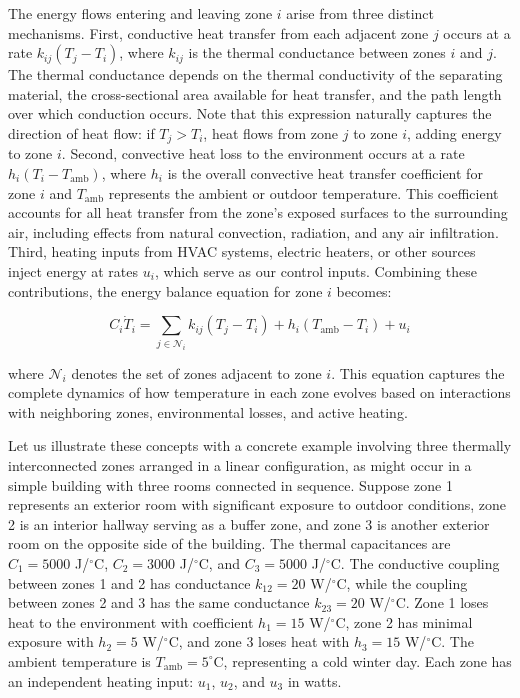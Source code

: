The energy flows entering and leaving zone $i$ arise from three distinct mechanisms. First, conductive heat transfer from each adjacent zone $j$ occurs at a rate $k_{ij}(T_j - T_i)$, where $k_{ij}$ is the thermal conductance between zones $i$ and $j$. The thermal conductance depends on the thermal conductivity of the separating material, the cross-sectional area available for heat transfer, and the path length over which conduction occurs. Note that this expression naturally captures the direction of heat flow: if $T_j > T_i$, heat flows from zone $j$ to zone $i$, adding energy to zone $i$. Second, convective heat loss to the environment occurs at a rate $h_{i}(T_i - T_{\text{amb}})$, where $h_i$ is the overall convective heat transfer coefficient for zone $i$ and $T_{\text{amb}}$ represents the ambient or outdoor temperature. This coefficient accounts for all heat transfer from the zone's exposed surfaces to the surrounding air, including effects from natural convection, radiation, and any air infiltration. Third, heating inputs from HVAC systems, electric heaters, or other sources inject energy at rates $u_i$, which serve as our control inputs. Combining these contributions, the energy balance equation for zone $i$ becomes:

$$C_i \dot{T}_i = \sum_{j \in \mathcal{N}_i} k_{ij}(T_j - T_i) + h_i(T_{\text{amb}} - T_i) + u_i$$

where $\mathcal{N}_i$ denotes the set of zones adjacent to zone $i$. This equation captures the complete dynamics of how temperature in each zone evolves based on interactions with neighboring zones, environmental losses, and active heating.

Let us illustrate these concepts with a concrete example involving three thermally interconnected zones arranged in a linear configuration, as might occur in a simple building with three rooms connected in sequence. Suppose zone 1 represents an exterior room with significant exposure to outdoor conditions, zone 2 is an interior hallway serving as a buffer zone, and zone 3 is another exterior room on the opposite side of the building. The thermal capacitances are $C_1 = 5000$ J/$\!^\circ$C, $C_2 = 3000$ J/$\!^\circ$C, and $C_3 = 5000$ J/$\!^\circ$C. The conductive coupling between zones 1 and 2 has conductance $k_{12} = 20$ W/$\!^\circ$C, while the coupling between zones 2 and 3 has the same conductance $k_{23} = 20$ W/$\!^\circ$C. Zone 1 loses heat to the environment with coefficient $h_1 = 15$ W/$\!^\circ$C, zone 2 has minimal exposure with $h_2 = 5$ W/$\!^\circ$C, and zone 3 loses heat with $h_3 = 15$ W/$\!^\circ$C. The ambient temperature is $T_{\text{amb}} = 5^\circ$C, representing a cold winter day. Each zone has an independent heating input: $u_1$, $u_2$, and $u_3$ in watts.


